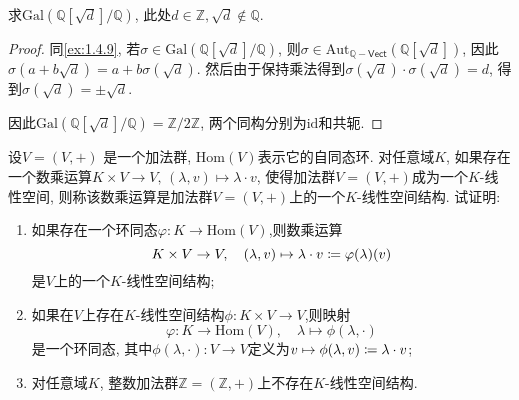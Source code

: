 \begin{problem}
    求$\mathrm{Gal}\left(\mathbb{Q}[\sqrt{d}]/\mathbb{Q}\right)$, 此处$d \in \mathbb{Z}, \sqrt{d} \notin \mathbb{Q}$.
\end{problem}

\begin{proof}
    同\ref{ex:1.4.9}, 若$\sigma \in \mathrm{Gal}\left(\mathbb{Q}[\sqrt{d}]/\mathbb{Q}\right)$, 则$\sigma \in \mathrm{Aut}_{\mathbb{Q}-\mathsf{Vect}}\left(\mathbb{Q}[\sqrt{d}]\right)$, 因此$\sigma(a + b\sqrt{d}) = a + b\sigma(\sqrt{d})$. 然后由于保持乘法得到$\sigma(\sqrt{d}) \cdot \sigma(\sqrt{d}) = d$, 得到$\sigma(\sqrt{d}) = \pm\sqrt{d}$.

    因此$\mathrm{Gal}\left(\mathbb{Q}[\sqrt{d}]/\mathbb{Q}\right) = \mathbb{Z}/2\mathbb{Z}$, 两个同构分别为$\mathrm{id}$和共轭.
\end{proof}

\begin{problem}\label{ex:1.4.13}
    设$V = (V, +)$ 是一个加法群, $\mathrm{Hom}(V)$表示它的自同态环. 对任意域$K$, 如果存在一个数乘运算$K \times V \to V,\, (\lambda,v) \mapsto \lambda \cdot v$, 使得加法群$V = (V, +)$成为一个$K$-线性空间, 则称该数乘运算是加法群$V = (V, +)$上的一个$K$-线性空间结构. 试证明:
    \begin{enumerate}[(1)]
        \item 如果存在一个环同态$\varphi:K \to \mathrm{Hom}(V)$,则数乘运算
        \[
            K \times V \to V,\quad (\lambda, v) \mapsto \lambda \cdot v \mathrel{\coloneqq} \varphi(\lambda)(v)
        \]
        是$V$上的一个$K$-线性空间结构;
        \item 如果在$V$上存在$K$-线性空间结构$\phi:K \times V \to V$,则映射
        \[
            \varphi:K \to \mathrm{Hom}(V),\quad \lambda \mapsto \phi(\lambda, \cdot)
        \]
        是一个环同态, 其中$\phi(\lambda, \cdot):V \to V$定义为$v \mapsto \phi(\lambda, v) \mathrel{\coloneqq} \lambda \cdot v$;
        \item 对任意域$K$, 整数加法群$\mathbb{Z} = (\mathbb{Z}, +)$上不存在$K$-线性空间结构.
    \end{enumerate}
\end{problem}

